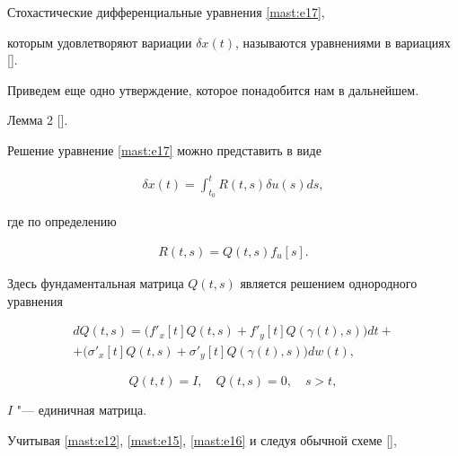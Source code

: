 Стохастические дифференциальные уравнения  \eqref{mast:e17}, 

которым удовлетворяют вариации $ \delta x(t) $,  называются уравнениями в вариациях  [].



Приведем еще одно утверждение, которое понадобится нам в дальнейшем.



\smallskip





{\small \sc Лемма 2 [].} \it

Решение уравнение \eqref{mast:e17}  можно представить в виде

\begin{gather}

\delta x(t)=\int^{t } _{t_{0}} R(t, s) \delta u(s) ds,

  \label{mast:e18}

\end{gather}

где по определению

\begin{gather*}

R(t,s)=Q(t,s) f_{u}[s].

\end{gather*}



\rm



\smallskip



Здесь фундаментальная матрица $ Q(t,s) $ является решением однородного  уравнения

\begin{multline}

  \label{mast:e19}

dQ(t,s)= \bigl(f'_{x}[t] Q(t,s)+f'_{y}[t] Q(\gamma(t),s)\bigr) dt+ \\

+ \bigl(\sigma'_{x}[t] Q(t,s)+\sigma'_{y}[t] Q(\gamma(t),s)\bigr) dw(t),

\end{multline}

$$

Q(t,t)=I, \quad  Q(t,s)=0, \quad s>t, 

$$

$I$ "--- единичная матрица.



Учитывая \eqref{mast:e12}, \eqref{mast:e15}, \eqref{mast:e16} и следуя обычной схеме  [], 

